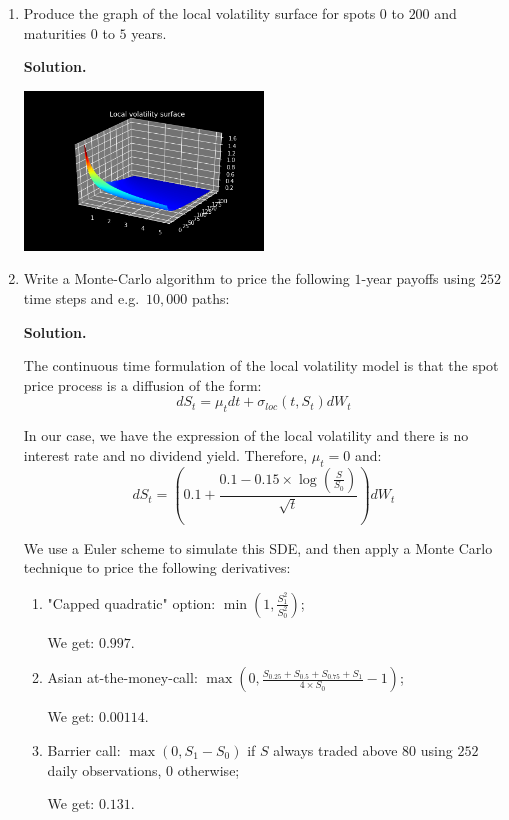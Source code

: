 \documentclass[12pt]{article}
\newenvironment{solution}{\vspace{0.2cm} \textbf{Solution.}}{}
\begin{document}
	\begin{enumerate}[label=(\alph*)]
		
		\item Produce the graph of the local volatility surface for spots $0$ to $200$ and maturities $0$ to $5$ years.
		
		\begin{solution}
			
			\begin{center}
				\includegraphics[width=0.5\textwidth]{local_vol}
			\end{center}
			
		\end{solution}
		
		\item Write a Monte-Carlo algorithm to price the following $1$-year payoffs using $252$ time steps and e.g.\ $10,000$ paths:
		
		\begin{solution}
			
			The continuous time formulation of the local volatility model is that the spot price process is a diffusion of the form:
			$$ dS_t = \mu_t dt + \sigma_{loc} (t,S_t) dW_t$$
			
			In our case, we have the expression of the local volatility and there is no interest rate and no dividend yield. Therefore, $\mu_t = 0$ and:
			$$ dS_t =  \left( 0.1 + \frac{0.1 - 0.15 \times \log\left(\frac{S}{S_0}\right)}{\sqrt{t}} \right) dW_t$$
			
			We use a Euler scheme to simulate this SDE, and then apply a Monte Carlo technique to price the following derivatives:
			
			\begin{enumerate}[label=(\roman*)]
	
				\item "Capped quadratic" option: $\min\left(1,\frac{S_1^2}{S_0^2}\right)$;
								
				We get: $0.997$.
				
				\item Asian at-the-money-call: $\max\left(0, \frac{S_{0.25} + S_{0.5} + S_{0.75} + S_1}{4 \times S_0} - 1\right)$;
				
				We get: $0.00114$.
				
				\item Barrier call: $\max(0, S_1 - S_0)$ if $S$ always traded above $80$ using $252$ daily observations, 0 otherwise;
				
				We get: $0.131$.
				
			\end{enumerate}
			
		\end{solution}
		
	\end{enumerate}
\end{document}
